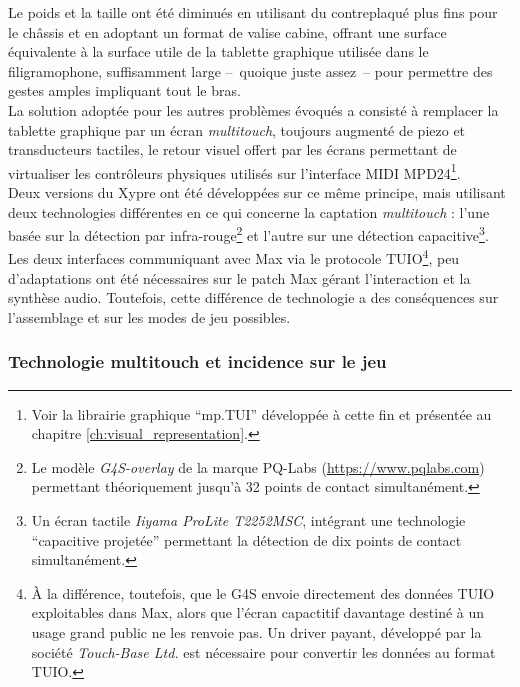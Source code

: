 \noindent Le poids et la taille ont été diminués en utilisant du contreplaqué plus fins pour le châssis et en adoptant un format de valise cabine, offrant une surface équivalente à la surface utile de la tablette graphique utilisée dans le filigramophone, suffisamment large --~quoique juste assez~-- pour permettre des gestes amples impliquant tout le bras.\\
\indent La solution adoptée pour les autres problèmes évoqués a consisté à remplacer la tablette graphique par un écran \textit{multitouch}, toujours augmenté de piezo et transducteurs tactiles, le retour visuel offert par les écrans permettant de virtualiser les contrôleurs physiques utilisés sur l'interface \gls{MIDI} MPD24\footnote{Voir la librairie graphique ``mp.TUI'' développée à cette fin et présentée au chapitre \ref{ch:visual_representation}.}.\\
\indent Deux versions du Xypre ont été développées sur ce même principe, mais utilisant deux technologies différentes en ce qui concerne la captation \textit{multitouch} : l'une basée sur la détection par infra-rouge\footnote{Le modèle \textit{G4S-overlay} de la marque PQ-Labs (\url{https://www.pqlabs.com}) permettant théoriquement jusqu'à 32 points de contact simultanément.} et l'autre sur une détection capacitive\footnote{Un écran tactile \textit{Iiyama ProLite T2252MSC}, intégrant une technologie ``capacitive projetée'' permettant la détection de dix points de contact simultanément.}. Les deux interfaces communiquant avec Max via le protocole \gls{TUIO}\footnote{À la différence, toutefois, que le G4S envoie directement des données \gls{TUIO} exploitables dans Max, alors que l'écran capactitif davantage destiné à un usage grand public ne les renvoie pas. Un driver payant, développé par la société \textit{Touch-Base Ltd.} est nécessaire pour convertir les données au format \gls{TUIO}.}, peu d'adaptations ont été nécessaires sur le patch Max gérant l'interaction et la synthèse audio. Toutefois, cette différence de technologie a des conséquences sur l'assemblage et sur les modes de jeu possibles. 

\subsubsection{Technologie multitouch et incidence sur le jeu}

